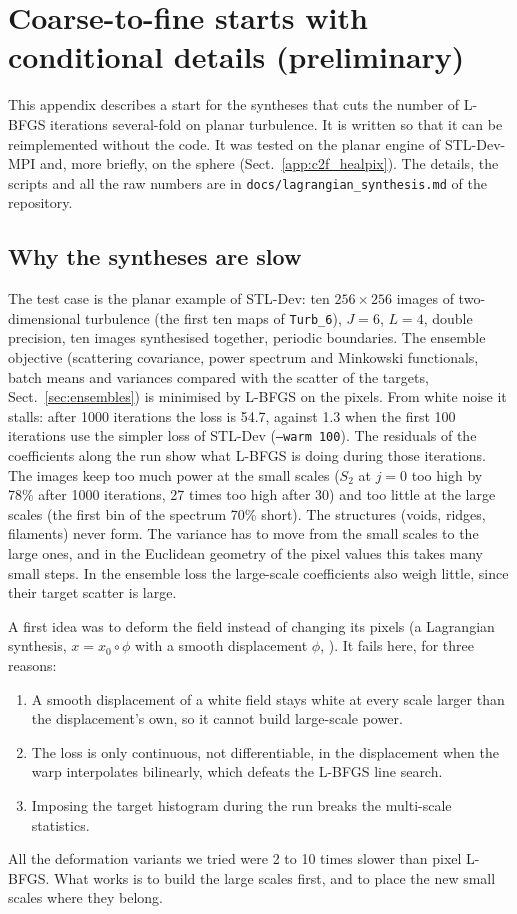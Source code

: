 \section{Coarse-to-fine starts with conditional details (preliminary)}
\label{app:c2f}

This appendix describes a start for the syntheses that cuts the number of L-BFGS iterations several-fold on planar turbulence. It is written so that it can be reimplemented without the code. It was tested on the planar engine of STL-Dev-MPI and, more briefly, on the sphere (Sect.~\ref{app:c2f_healpix}). The details, the scripts and all the raw numbers are in \texttt{docs/lagrangian\_synthesis.md} of the repository.

\subsection{Why the syntheses are slow}

The test case is the planar example of STL-Dev: ten $256\times256$ images of two-dimensional turbulence (the first ten maps of \texttt{Turb\_6}), $J=6$, $L=4$, double precision, ten images synthesised together, periodic boundaries. The ensemble objective (scattering covariance, power spectrum and Minkowski functionals, batch means and variances compared with the scatter of the targets, Sect.~\ref{sec:ensembles}) is minimised by L-BFGS on the pixels. From white noise it stalls: after 1000 iterations the loss is 54.7, against 1.3 when the first 100 iterations use the simpler loss of STL-Dev (\texttt{--warm 100}). The residuals of the coefficients along the run show what L-BFGS is doing during those iterations. The images keep too much power at the small scales ($S_2$ at $j=0$ too high by 78\% after 1000 iterations, 27 times too high after 30) and too little at the large scales (the first bin of the spectrum 70\% short). The structures (voids, ridges, filaments) never form. The variance has to move from the small scales to the large ones, and in the Euclidean geometry of the pixel values this takes many small steps. In the ensemble loss the large-scale coefficients also weigh little, since their target scatter is large.

A first idea was to deform the field instead of changing its pixels (a Lagrangian synthesis, $x = x_0\circ\phi$ with a smooth displacement $\phi$, \citealt{zeldovich1970}). It fails here, for three reasons:
\begin{enumerate}
\item A smooth displacement of a white field stays white at every scale larger than the displacement's own, so it cannot build large-scale power.
\item The loss is only continuous, not differentiable, in the displacement when the warp interpolates bilinearly, which defeats the L-BFGS line search.
\item Imposing the target histogram during the run breaks the multi-scale statistics.
\end{enumerate}
All the deformation variants we tried were 2 to 10 times slower than pixel L-BFGS. What works is to build the large scales first, and to place the new small scales where they belong.

